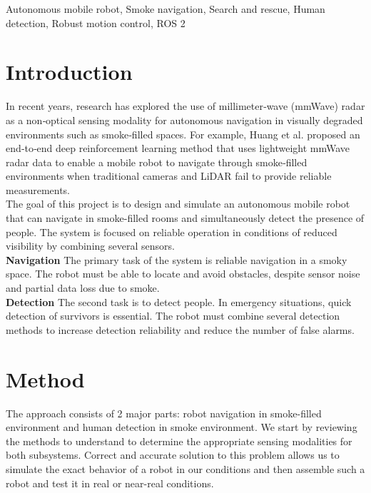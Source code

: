 \documentclass[conference]{IEEEtran}
\begin{document}
\begin{IEEEkeywords}
Autonomous mobile robot, Smoke navigation, Search and rescue, Human detection, Robust motion control, ROS 2
\end{IEEEkeywords}

\section*{Introduction}
In recent years, research has explored the use of millimeter‑wave (mmWave) radar as a non‑optical sensing modality for autonomous navigation in visually degraded environments such as smoke‑filled spaces. For example, Huang et al. \cite{huang_mmWaveNav} proposed an end‑to‑end deep reinforcement learning method that uses lightweight mmWave radar data to enable a mobile robot to navigate through smoke‑filled environments when traditional cameras and LiDAR fail to provide reliable measurements.\\

The goal of this project is to design and simulate an autonomous mobile robot that can navigate in smoke-filled rooms and simultaneously detect the presence of people. The system is focused on reliable operation in conditions of reduced visibility by combining several sensors.\\

\textbf{Navigation}
\newline
The primary task of the system is reliable navigation in a smoky space. The robot must be able to locate and avoid obstacles, despite sensor noise and partial data loss due to smoke.\\

\textbf{Detection}
\newline
The second task is to detect people. In emergency situations, quick detection of survivors is essential. The robot must combine several detection methods to increase detection reliability and reduce the number of false alarms.\\

\section*{Method}
The approach consists of 2 major parts: robot navigation in smoke-filled environment and human detection in smoke environment. We start by reviewing the methods to understand to determine the appropriate sensing modalities for both subsystems. Correct and accurate solution to this problem allows us to simulate the exact behavior of a robot in our conditions and then assemble such a robot and test it in real or near-real conditions.
\end{document}
